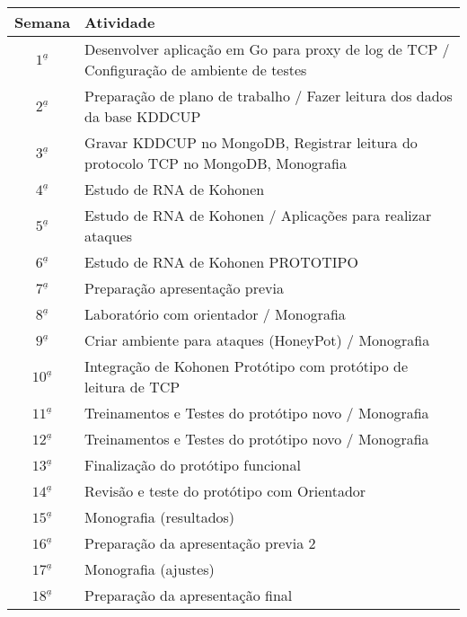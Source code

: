 \documentclass[12pt]{article}
\begin{document}
\begin{center}
\begin{tabular}{ |c| p{15.5cm} | }
	\hline
	\textbf{Semana} & \textbf{Atividade} \\ \hline \hline
	$1^{\underline a}$ & Desenvolver aplicação em Go para proxy de log de TCP / Configuração de ambiente de testes \\ \hline
	$2^{\underline a}$ & Preparação de plano de trabalho / Fazer leitura dos dados da base KDDCUP \\ \hline
	$3^{\underline a}$ & Gravar KDDCUP no MongoDB, Registrar leitura do protocolo TCP no MongoDB, Monografia \\ \hline		
	$4^{\underline a}$ & Estudo de RNA de Kohonen  \\ \hline		
	$5^{\underline a}$ & Estudo de RNA de Kohonen /  Aplicações para realizar ataques  \\ \hline		
	$6^{\underline a}$ &  Estudo de RNA de Kohonen PROTOTIPO \\ \hline		
	$7^{\underline a}$ & Preparação apresentação previa  \\ \hline		
	$8^{\underline a}$ & Laboratório com orientador / Monografia \\ \hline		
	$9^{\underline a}$ & Criar ambiente para ataques (HoneyPot)   /  Monografia  \\ \hline		
	$10^{\underline a}$ & Integração de Kohonen Protótipo com protótipo de leitura de TCP  \\ \hline		
	$11^{\underline a}$ & Treinamentos e Testes do protótipo novo / Monografia\\ \hline		
	$12^{\underline a}$ & Treinamentos e Testes do protótipo novo / Monografia  \\ \hline		
	$13^{\underline a}$ & Finalização do protótipo funcional  \\ \hline		
	$14^{\underline a}$ & Revisão e teste do protótipo com Orientador \\ \hline		
	$15^{\underline a}$ & Monografia (resultados) \\ \hline		
	$16^{\underline a}$ & Preparação da apresentação previa 2  \\ \hline		
	$17^{\underline a}$ & Monografia (ajustes)  \\ \hline
	$18^{\underline a}$ & Preparação da apresentação final  \\ \hline
\end{tabular}
\end{center}

\vspace{1.25cm}
\end{document}
